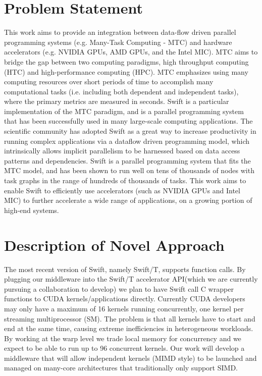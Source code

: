 \documentclass[conference]{IEEEtran}
\begin{document}
\section{Problem Statement}
This work aims to provide an integration between data-flow driven parallel programming systems (e.g. Many-Task Computing - MTC) and hardware accelerators \cite{kriederGCASR12} (e.g. NVIDIA GPUs, AMD GPUs, and the Intel MIC). MTC aims to bridge the gap between two computing paradigms, high throughput computing (HTC) and high-performance computing (HPC). MTC emphasizes using many computing resources over short periods of time to accomplish many computational tasks (i.e. including both dependent and independent tasks), where the primary metrics are measured in seconds. \cite{raicu2008toward} Swift is a particular implementation of the MTC paradigm, and is a parallel programming system that has been successfully used in many large-scale computing applications. \cite{zhao2007swift} The scientific community has adopted Swift as a great way to increase productivity in running complex applications via a dataflow driven programming model, which intrinsically allows implicit parallelism to be harnessed based on data access patterns and dependencies. Swift is a parallel programming system that fits the MTC model, and has been shown to run well on tens of thousands of nodes with task graphs in the range of hundreds of thousands of tasks. This work aims to enable Swift to efficiently use accelerators (such as NVIDIA GPUs and Intel MIC) to further accelerate a wide range of applications, on a growing portion of high-end systems.
\section{Description of Novel Approach}
The most recent version of Swift, namely Swift/T, supports function calls.\cite{wozniak13swift} By plugging our middleware into the Swift/T accelerator API(which we are currently pursuing a collaboration to develop) we plan to have Swift call C wrapper functions to CUDA kernels/applications directly. Currently CUDA developers may only have a maximum of 16 kernels running concurrently, one kernel per streaming multiprocessor (SM). The problem is that all kernels have to start and end at the same time, causing extreme inefficiencies in heterogeneous workloads. By working at the warp level we trade local memory for concurrency and we expect to be able to run up to 96 concurrent kernels. Our work will develop a middleware that will allow independent kernels (MIMD style) to be launched and managed on many-core architectures that traditionally only support SIMD. \cite{kriederXSEDE12}
\end{document}
